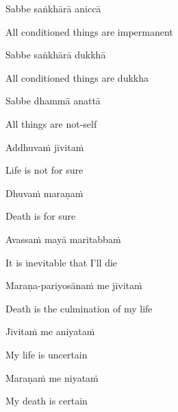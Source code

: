 Sabbe saṅkhārā aniccā

\begin{english}
  All conditioned things are impermanent
\end{english}

Sabbe saṅkhārā dukkhā

\begin{english}
  All conditioned things are dukkha
\end{english}

Sabbe dhammā anattā

\begin{english}
  All things are not-self\ifdigitalversion\makeatletter\hyperlink{endnote104-appendix}\makeatother\fi
\end{english}

\suttaRef{[Dhp 277-279]}

Addhuvaṁ jīvitaṁ

\begin{english}
  Life is not for sure
\end{english}

Dhuvaṁ maraṇaṁ

\begin{english}
  Death is for sure
\end{english}

Avassaṁ mayā maritabbaṁ

\begin{english}
  It is inevitable that I'll die
\end{english}

Maraṇa-pariyosānaṁ me jīvitaṁ

\begin{english}
  Death is the culmination of my life
\end{english}

Jīvitaṁ me aniyataṁ

\begin{english}
  My life is uncertain
\end{english}

Maraṇaṁ me niyataṁ

\begin{english}
  My death is certain
\end{english}

\suttaRef{[Dhp A]}

\ifafiveversion\clearpage\fi
\ifbfiveversion\clearpage\fi

